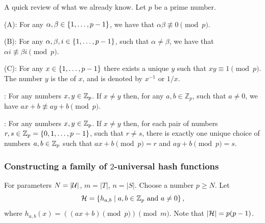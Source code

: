 \begin{remark}
    A quick review of what we already know. 
    Let $p$ be a prime number.

    \begin{compactenumA}
        \item {}(A): For any
        $\alpha, \beta \in \left\{ { 1, \ldots, p-1} \right\}$, we have that
        $\alpha \beta \not \equiv 0 \pmod{p}$.

        \item {}(B): For any
        $\alpha, \beta, i \in \left\{ { 1,\ldots, p-1} \right\}$, such that
        $\alpha \ne \beta$, we have that
        $\alpha i \nequiv \beta i \pmod{p}$.

        
        \item {}(C): For any
        $x \in \left\{ {1,\ldots, p-1} \right\}$ there exists a unique $y$ such
        that $xy \equiv 1 \pmod{p}$. The number $y$ is the
         of $x$, and is denoted by $x^{-1}$ or $1/x$. %

        \item {}: For any numbers
        $x, y \in \mathbb{Z}_p$.  If $x \neq y$ then, for any
        $a, b \in \mathbb{Z}_p$, such that $a \neq 0$, we have
        $a x + b \nequiv a y + b \pmod p$.

        \item {}: For any numbers
        $x, y \in \mathbb{Z}_p$.  If $x \neq y$ then, for each pair of
        numbers $r,s \in \mathbb{Z}_{p} = \{0,1, \ldots, p-1\}$, such that
        $r \neq s$, there is exactly one unique choice of numbers
        $a,b \in \mathbb{Z}_p$ such that $ax + b \pmod p = r$ and
        $ay + b \pmod p = s$.

    \end{compactenumA}
\end{remark}




\subsubsection{Constructing a family of $2$-universal hash functions}

For parameters $N = |\mathcal{U}|$, $m = |T|$, $n = |S|$. Choose a
 number $p \ge N$. Let
\begin{equation*}
    \mathcal{H} = \left\{ h_{a,b}  \;\middle\vert\; a,b \in \mathbb{Z}_p \text{ and } a \neq 0 \right\},
\end{equation*}
where $h_{a,b}(x) = ((ax + b) \pmod p) \pmod m$. Note that
$|\mathcal{H}| = p(p-1)$. %

